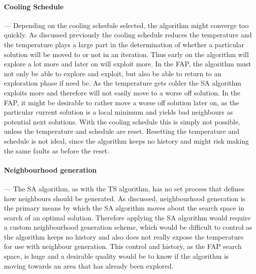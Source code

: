 \paragraph{Cooling Schedule}
--- Depending on the cooling schedule selected, the algorithm might converge too quickly. As discussed previously the cooling schedule reduces the temperature and the temperature plays a large part in the determination of whether a particular solution will be moved to or not in an iteration. Thus early on the algorithm will explore a lot more and later on will exploit more. In the FAP, the algorithm must not only be able to explore and exploit, but also be able to return to an exploration phase if need be.
As the temperature gets colder the SA algorithm exploits more and therefore will not easily move to a worse off solution. In the FAP, it might be desirable to rather move a worse off solution later on, as the particular current solution is a local minimum and yields bad neighbours as potential next solutions. With the cooling schedule this is simply not possible, unless the temperature and schedule are reset. Resetting the temperature and schedule is not ideal, since the algorithm keeps no history and might risk making the same faults as before the reset.
\paragraph{Neighbourhood generation}
--- The SA algorithm, as with the TS algorithm, has no set process that defines how neighbours should be generated. As discussed, neighbourhood generation is the primary means by which the SA algorithm moves about the search space in search of an optimal solution. Therefore applying the SA algorithm would require a custom neighbourhood generation scheme, which would be difficult to control as the algorithm keeps no history and also does not really expose the temperature for use with neighbour generation. This control and history, as the FAP search space, is huge and a desirable quality would be to know if the algorithm is moving towards an area that has already been explored.
